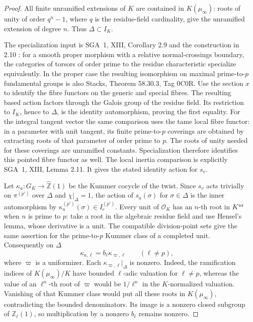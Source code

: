\documentclass[11pt,a4paper]{article}
\begin{document}
\begin{proof}
All finite unramified extensions of $K$ are contained in
$K(\mu_\infty)$: roots of unity of order $q^n-1$, where $q$ is the
residue-field cardinality, give the unramified extension of degree $n$.
Thus $\Delta\subset I_K$.

The specialization input is SGA~1, XIII, Corollary 2.9 and the
construction in 2.10 \cite{D_SGA1}: for a smooth proper morphism with
a relative normal-crossings boundary, the categories of torsors of
order prime to the residue characteristic specialize equivalently.
In the proper case the resulting isomorphism on maximal prime-to-$p$
fundamental groups is also Stacks, Theorem 58.30.3, Tag 0C0R.
Use the section $x$ to identify the fibre functors on the generic and
special fibres.  The resulting based action factors through the
Galois group of the residue field.  Its restriction to $I_K$, hence to
$\Delta$, is the identity automorphism, proving the first equality.
For the integral tangent vector the same comparison uses the tame
local fibre functor: in a parameter with unit tangent, its finite
prime-to-$p$ coverings are obtained by extracting roots of that
parameter of order prime to $p$.  The roots of unity needed for these
coverings are unramified constants.  Specialization therefore
identifies this pointed fibre functor as well.  The local inertia
comparison is explicitly SGA~1, XIII, Lemma 2.11.  It gives the stated
identity action for $s_v$.

Let $\kappa_a:G_K\to\widehat{\mathbb Z}(1)$ be the Kummer cocycle of
the twist.  Since $s_v$ acts trivially on $\pi^{(p')}$ over $\Delta$
and $\chi|_\Delta=1$, the action of $s_a(\sigma)$ for $\sigma\in\Delta$
is the inner automorphism by $\kappa_a^{(p')}(\sigma)\in I_c^{(p')}$.
Every unit of $\mathcal O_K$ has an $n$-th root in $K^{\rm nr}$ when
$n$ is prime to $p$: take a root in the algebraic residue field and
use Hensel's lemma, whose derivative is a unit.  The compatible
division-point sets give the same assertion for the prime-to-$p$
Kummer class of a completed unit.  Consequently on $\Delta$
\[
       \kappa_{a,\ell}=b_\ell\kappa_{\varpi,\ell}\qquad(\ell\ne p),
\]
where $\varpi$ is a uniformizer.
Each $\kappa_{\varpi,\ell}|_\Delta$ is nonzero.  Indeed, the
ramification indices of $K(\mu_\infty)/K$ have bounded
$\ell$-adic valuation for $\ell\ne p$, whereas the value of an
$\ell^n$-th root of $\varpi$ would be $1/\ell^n$ in the
$K$-normalized valuation.  Vanishing of that Kummer class would put
all these roots in $K(\mu_\infty)$, contradicting the bounded
denominators.  Its image is a nonzero closed subgroup of
$\mathbb Z_\ell(1)$, so multiplication by a nonzero $b_\ell$ remains
nonzero.


\end{proof}
\end{document}
